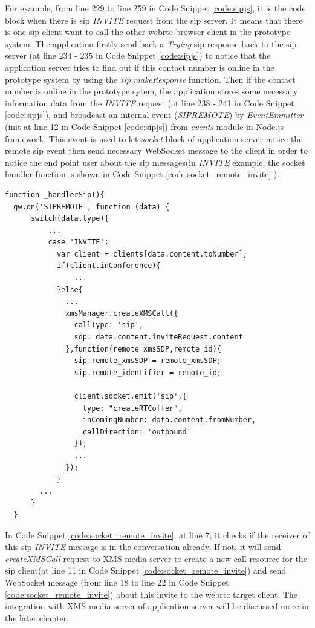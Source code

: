 \par For example, from line 229 to line 259 in Code Snippet \ref{code:sipjs}, it is the code block when there is \gls{sip} \textit{INVITE} request from the \gls{sip} server. It means that there is one \gls{sip} client want to call the other \gls{webrtc} browser client in the prototype system. The application firstly send back a \textit{Trying} \gls{sip} response back to the \gls{sip} server (at line 234 - 235 in Code Snippet \ref{code:sipjs}) to notice that the application server tries to find out if this contact number is online in the prototype system by using the \textit{sip.makeResponse} function. Then if the contact number is online in the prototype sytem, the application stores some necessary information data from the \textit{INVITE} request (at line 238 - 241 in Code Snippet \ref{code:sipjs}), and broadcast an internal event (\textit{SIPREMOTE}) by \textit{EventEmmitter} (init at line 12 in Code Snippet \ref{code:sipjs}) from \textit{events} module in Node.js framework. This event is used to let \textit{socket} block of application server notice the remote \gls{sip} event then send necessary WebSocket message to the client in order to notice the end point user about the \gls{sip} messages(in \textit{INVITE} example, the socket handler function is shown in Code Snippet \ref{code:socket_remote_invite} ).

\begin{lstlisting}[caption={SIPREMOTE event handler for INVITE message},label={code:socket_remote_invite}]
function _handlerSip(){
  gw.on('SIPREMOTE', function (data) {
      switch(data.type){
          ...
          case 'INVITE':
            var client = clients[data.content.toNumber];
            if(client.inConference){
                ...
            }else{
              ...
              xmsManager.createXMSCall({
                callType: 'sip',
                sdp: data.content.inviteRequest.content
              },function(remote_xmsSDP,remote_id){
                sip.remote_xmsSDP = remote_xmsSDP;
                sip.remote_identifier = remote_id;

                client.socket.emit('sip',{
                  type: "createRTCoffer",
                  inComingNumber: data.content.fromNumber,
                  callDirection: 'outbound'
                });
                ...
              });
            }
        ...
      }
  }
\end{lstlisting}

\par In Code Snippet \ref{code:socket_remote_invite}, at line 7, it checks if the receiver of this \gls{sip} \textit{INVITE} message is in the conversation already. If not, it will send \textit{createXMSCall} request to XMS media server to create a new call resource for the \gls{sip} client(at line 11 in Code Snippet \ref{code:socket_remote_invite}) and send WebSocket message (from line 18 to line 22 in Code Snippet \ref{code:socket_remote_invite}) about this invite to the \gls{webrtc} target client. The integration with XMS media server of application server will be discussed more in the later chapter.


